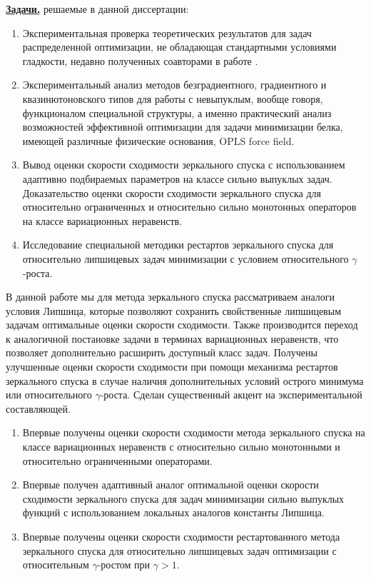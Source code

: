 {\underline{\textbf{Задачи,}}} решаемые в данной диссертации:
\begin{enumerate}
    \item Экспериментальная проверка теоретических результатов для задач распределенной оптимизации, не обладающая стандартными условиями гладкости, недавно полученных соавторами в работе \cite{GorbunovKMR20}.
    \item Экспериментальный анализ методов безградиентного, градиентного и квазинютоновского типов для работы с невыпуклым, вообще говоря, функционалом специальной структуры, а именно практический анализ возможностей эффективной оптимизации для задачи минимизации белка, имеющей различные физические основания,  OPLS force field. 
    \item Вывод оценки скорости сходимости зеркального спуска с использованием адаптивно подбираемых параметров на классе сильно выпуклых задач. Доказательство оценки скорости сходимости зеркального спуска для относительно ограниченных и относительно сильно монотонных операторов на классе вариационных неравенств.
    \item Исследование специальной методики рестартов зеркального спуска для относительно липшицевых задач минимизации с условием относительного $\gamma$-роста. 
\end{enumerate}
В данной работе мы для метода зеркального спуска рассматриваем аналоги условия Липшица, которые позволяют сохранить свойственные липшицевым задачам оптимальные оценки скорости сходимости. Также производится переход к аналогичной постановке задачи в терминах вариационных неравенств, что позволяет дополнительно расширить доступный класс задач. Получены улучшенные оценки скорости сходимости при помощи механизма рестартов зеркального спуска в случае наличия дополнительных условий острого минимума или относительного $\gamma$-роста. Сделан существенный акцент на экспериментальной составляющей.

{\novelty}
\begin{enumerate}[beginpenalty=10000] %
  \item Впервые получены оценки скорости сходимости метода зеркального спуска на классе вариационных неравенств с относительно сильно монотонными и относительно ограниченными операторами.
  \item Впервые получен адаптивный аналог оптимальной оценки скорости сходимости зеркального спуска для задач минимизации сильно выпуклых функций с использованием локальных аналогов константы Липшица.
  \item Впервые получены оценки скорости сходимости рестартованного метода зеркального спуска для относительно липшицевых задач оптимизации с относительным $\gamma$-ростом при $\gamma > 1$. 
\end{enumerate}

